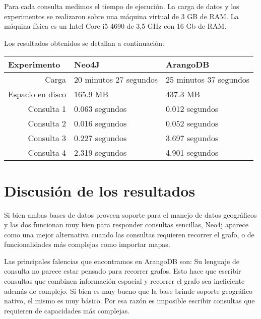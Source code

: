 \documentclass{llncs}
\begin{document}
Para cada consulta medimos el tiempo de ejecución. La carga de datos y los experimentos se realizaron sobre una máquina virtual de 3 GB de RAM. La máquina física es un Intel Core i5 4690 de 3,5 GHz con 16 Gb de RAM.

Los resultados obtenidos se detallan a continuación:
\vspace{-1em}
\begin{table}
\begin{center}
\begin{tabular}{r@{\quad}ll}%
\hline
\multicolumn{1}{l}{Experimento}&\multicolumn{1}{l}{Neo4J}&\multicolumn{1}{l}{ArangoDB}\\
\hline\rule{0pt}{12pt}
Carga & 20 minutos 27 segundos & 25 minutos 37 segundos \\
Espacio en disco & 165.9 MB & 437.3 MB \\
Consulta 1 & 0.063 segundos & 0.012 segundos \\
Consulta 2 & 0.016 segundos & 0.052 segundos \\
Consulta 3 & 0.227 segundos & 3.697 segundos \\
Consulta 4 & 2.319 segundos & 4.901 segundos \\
\hline
\end{tabular}
\end{center}
\end{table}

\vspace{-4.5em}
\section{Discusión de los resultados}
\vspace{-0.5em}
Si bien ambas bases de datos proveen soporte para el manejo de datos geográficos y las dos funcionan muy bien para responder consultas sencillas, Neo4j aparece como una mejor alternativa cuando las consultas requieren recorrer el grafo, o de funcionalidades más complejas como importar mapas.

Las principales falencias que encontramos en ArangoDB son:
Su lenguaje de consulta no parece estar pensado para recorrer grafos. Esto hace que escribir consultas que combinen información espacial y recorrer el grafo sea ineficiente además de complejo.
Si bien es muy bueno que la base brinde soporte geográfico nativo, el mismo es muy básico. Por esa razón es imposible escribir consultas que requieren de capacidades más complejas.
\end{document}
